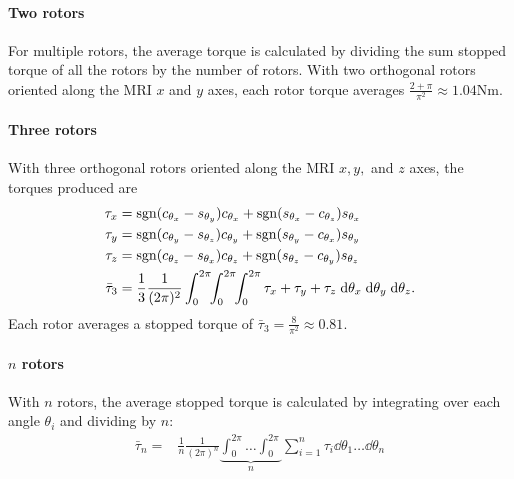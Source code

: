   \paragraph{Two rotors}  For multiple rotors, the average torque is calculated by dividing the sum stopped torque of all the rotors by the number of rotors.  With two orthogonal rotors oriented along the MRI $x$ and $y$ axes, each rotor torque averages  $\frac{2 + \pi}{\pi^2} \approx 1.04$Nm.  %

\paragraph{Three rotors}
With three orthogonal rotors oriented along the MRI $x,y,$ and $z$ axes,  the torques produced are
   \begin{align}  %
    \label{eq:torque3rotor}
  \tau_x &= \sgn( c_{\theta_x} -  s_{\theta_y}) c_{\theta_x}    + \sgn(s_{\theta_x} - c_{\theta_z} ) s_{\theta_x} \nonumber\\
  \tau_y  &=  \sgn( c_{\theta_y} -  s_{\theta_z}) c_{\theta_y} +  \sgn(s_{\theta_y} - c_{\theta_x} ) s_{\theta_y}\\  
  \tau_z  &= \sgn( c_{\theta_z} -  s_{\theta_x}) c_{\theta_z}  +   \sgn( s_{\theta_z} - c_{\theta_y} ) s_{\theta_z}\nonumber \\
 \bar{\tau}_3  &= \frac{1}{3}\frac{1}{(2\pi)^2} \int_0^{2\pi} \!\! \int_0^{2\pi} \!\! \int_0^{2\pi}   \tau_x +  \tau_y +  \tau_z  \dd\theta_x \dd\theta_y \dd\theta_z.\nonumber
\end{align} 
 Each rotor averages a stopped torque of $ \bar{\tau}_3=\frac{8}{\pi^2}\approx0.81$. 

\paragraph{$n$ rotors}
With $n$ rotors, the average stopped torque is calculated by integrating over each angle $\theta_i$ and dividing by $n$:
   \begin{align}  
      \bar{\tau}_n = &\frac{1}{n} \frac{1}{(2\pi)^n} \!\!  \underbrace{\int_0^{2\pi} \ldots \int_0^{2\pi}}_{n} \sum_{i=1}^{n} \tau_i   \dd\theta_1 \ldots \dd\theta_n
  \label{eq:torquenrotor}
\end{align} 

